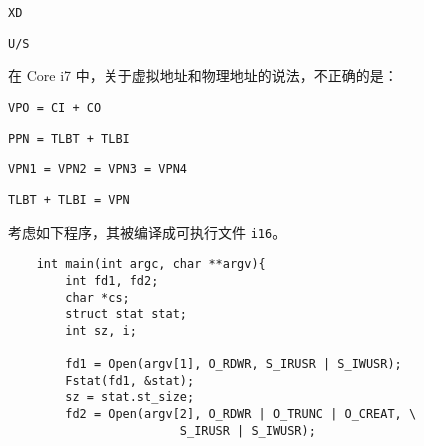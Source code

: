 \begin{problems}
\begin{choices}
            \item \verb|XD|
            \item \verb|U/S|
        \end{choices}
         在 Core i7 中，关于虚拟地址和物理地址的说法，不正确的是：
        \begin{choices}
            \item \verb|VPO = CI + CO|
            \item \verb|PPN = TLBT + TLBI|
            \item \verb|VPN1 = VPN2 = VPN3 = VPN4|
            \item \verb|TLBT + TLBI = VPN|
        \end{choices}
         考虑如下程序，其被编译成可执行文件 \verb|i16|。
        \begin{verbatim}
    int main(int argc, char **argv){
        int fd1, fd2;
        char *cs;
        struct stat stat;
        int sz, i;

        fd1 = Open(argv[1], O_RDWR, S_IRUSR | S_IWUSR);
        Fstat(fd1, &stat);
        sz = stat.st_size;
        fd2 = Open(argv[2], O_RDWR | O_TRUNC | O_CREAT, \
                        S_IRUSR | S_IWUSR);


\end{verbatim}
\end{problems}

